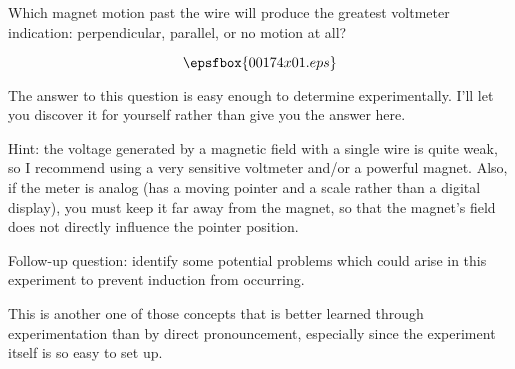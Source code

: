

Which magnet motion past the wire will produce the greatest voltmeter indication: perpendicular, parallel, or no motion at all?

$$\epsfbox{00174x01.eps}$$







The answer to this question is easy enough to determine experimentally.  I'll let you discover it for yourself rather than give you the answer here.

Hint: the voltage generated by a magnetic field with a single wire is quite weak, so I recommend using a very sensitive voltmeter and/or a powerful magnet.  Also, if the meter is analog (has a moving pointer and a scale rather than a digital display), you must keep it far away from the magnet, so that the magnet's field does not directly influence the pointer position.

\vskip 10pt

Follow-up question: identify some potential problems which could arise in this experiment to prevent induction from occurring.







This is another one of those concepts that is better learned through experimentation than by direct pronouncement, especially since the experiment itself is so easy to set up.




